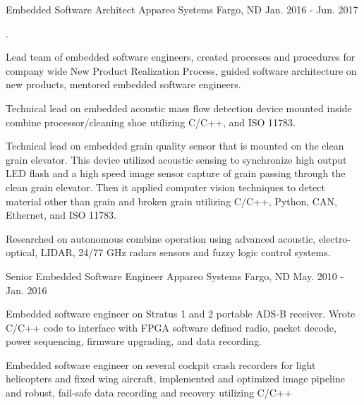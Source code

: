 \begin{cventries}
  \cventry
    {Embedded Software Architect} %
    {Appareo Systems} %
    {Fargo, ND} %
    {Jan. 2016 - Jun. 2017} %
    {.
      \begin{cvitems} %
        \item {Lead team of embedded software engineers, created processes and procedures for company wide New Product Realization Process, guided software architecture on new products, mentored embedded software engineers.}
        \item {Technical lead on embedded acoustic mass flow detection device mounted inside combine processor/cleaning shoe utilizing C/C++, and ISO 11783.}
        \item {Technical lead on embedded grain quality sensor that is mounted on the clean grain elevator. This device utilized acoustic sensing to synchronize high output LED flash and a high speed image sensor capture of grain passing through the clean grain elevator. Then it applied computer vision techniques to detect material other than grain and broken grain utilizing C/C++, Python, CAN, Ethernet, and ISO 11783.}
        \item {Researched on autonomous combine operation using advanced acoustic, electro-optical, LIDAR, 24/77 GHz radars sensors and fuzzy logic control systems.}
      \end{cvitems}
    }

  \cventry
    {Senior Embedded Software Engineer} %
    {Appareo Systems} %
    {Fargo, ND} %
    {May. 2010 - Jan. 2016} %
    {
      \begin{cvitems} %
        \item {Embedded software engineer on Stratus 1 and 2 portable ADS-B receiver. Wrote C/C++ code to interface with FPGA software defined radio, packet decode, power sequencing, firmware upgrading, and data recording.}
        \item {Embedded software engineer on several cockpit crash recorders for light helicopters and fixed wing aircraft, implemented and optimized image pipeline and robust, fail-safe data recording and recovery utilizing C/C++}
      \end{cvitems}
    }


\end{cventries}

